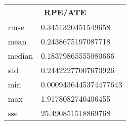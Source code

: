\begin{table}[!ht] 
 \centering 
 \begin{tabular}{|l|l|} \hline 
 \multicolumn{2}{|c|}{RPE/ATE} \\ \hline 
 rmse & 0.3451320451549658 \\ \hline 
mean & 0.2438675197087718 \\ \hline 
median & 0.18379865555080666 \\ \hline 
std & 0.24422277007670926 \\ \hline 
min & 0.0009436445374477643 \\ \hline 
max & 1.9178082740406455 \\ \hline 
sse & 25.490851518869768 \\ \hline 
\end{tabular} 
 \end{table}
